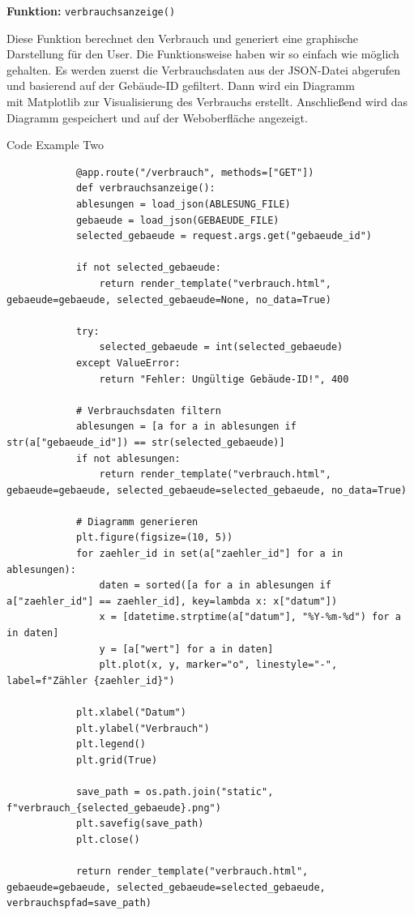 \textbf{Funktion: }\texttt{verbrauchsanzeige()}

Diese Funktion berechnet den Verbrauch und generiert eine graphische Darstellung für den User.
Die Funktionsweise haben wir so einfach wie möglich gehalten. Es werden zuerst die Verbrauchsdaten aus der JSON-Datei abgerufen und basierend auf der Gebäude-ID gefiltert. Dann wird ein Diagramm\\
mit Matplotlib zur Visualisierung des Verbrauchs erstellt. Anschließend wird das Diagramm gespeichert und auf der Weboberfläche angezeigt.\par

\begin{frame}{Code Example Two}
    \begin{verbatim}
            @app.route("/verbrauch", methods=["GET"])
            def verbrauchsanzeige():
            ablesungen = load_json(ABLESUNG_FILE)
            gebaeude = load_json(GEBAEUDE_FILE)
            selected_gebaeude = request.args.get("gebaeude_id")

            if not selected_gebaeude:
                return render_template("verbrauch.html", gebaeude=gebaeude, selected_gebaeude=None, no_data=True)

            try:
                selected_gebaeude = int(selected_gebaeude)
            except ValueError:
                return "Fehler: Ungültige Gebäude-ID!", 400

            # Verbrauchsdaten filtern
            ablesungen = [a for a in ablesungen if str(a["gebaeude_id"]) == str(selected_gebaeude)]
            if not ablesungen:
                return render_template("verbrauch.html", gebaeude=gebaeude, selected_gebaeude=selected_gebaeude, no_data=True)

            # Diagramm generieren
            plt.figure(figsize=(10, 5))
            for zaehler_id in set(a["zaehler_id"] for a in ablesungen):
                daten = sorted([a for a in ablesungen if a["zaehler_id"] == zaehler_id], key=lambda x: x["datum"])
                x = [datetime.strptime(a["datum"], "%Y-%m-%d") for a in daten]
                y = [a["wert"] for a in daten]
                plt.plot(x, y, marker="o", linestyle="-", label=f"Zähler {zaehler_id}")

            plt.xlabel("Datum")
            plt.ylabel("Verbrauch")
            plt.legend()
            plt.grid(True)

            save_path = os.path.join("static", f"verbrauch_{selected_gebaeude}.png")
            plt.savefig(save_path)
            plt.close()

            return render_template("verbrauch.html", gebaeude=gebaeude, selected_gebaeude=selected_gebaeude, verbrauchspfad=save_path)
    \end{verbatim}
\end{frame}

